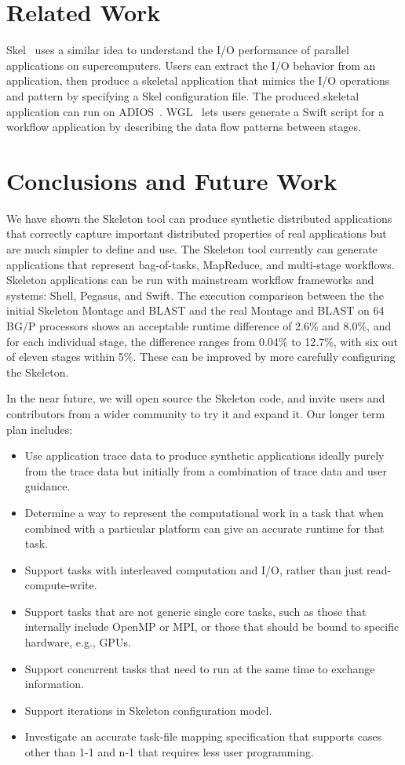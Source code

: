 \documentclass{sig-alternate}
\newenvironment{shortlist}{
        \vspace*{-0.5em}
  \begin{itemize}
  \setlength{\itemsep}{-0.1em}
}{
  \end{itemize}
        \vspace*{-0.5em}
}
\begin{document}
 
\section{Related Work}  \label{sec:related}
Skel~\cite{Skel} uses a similar idea to understand the I/O performance of parallel applications on supercomputers. Users can extract 
the I/O behavior from an application, then produce a skeletal application that mimics the I/O operations and pattern by specifying
a Skel configuration file. The produced skeletal application can run on ADIOS~\cite{ADIOS}. WGL~\cite{WGL} lets users generate a Swift script for a
workflow application by describing the data flow patterns between stages.


\section{Conclusions and Future Work} \label{sec:end}

We have shown the Skeleton tool can produce synthetic distributed applications that correctly capture important distributed properties of real applications but are much simpler to define and use.
The Skeleton tool currently can generate applications that represent bag-of-tasks, MapReduce, and multi-stage workflows.
Skeleton applications can be run with mainstream workflow frameworks and systems: Shell, Pegasus, and Swift.
The execution comparison between the the initial Skeleton Montage and BLAST and the real Montage and BLAST on 64 BG/P processors shows an acceptable runtime difference  of 2.6\% and 8.0\%, and for each individual
stage, the difference ranges from 0.04\% to 12.7\%, with six out of eleven stages within 5\%.  These can be improved by more carefully configuring the Skeleton.

In the near future, we will open source the Skeleton code, and invite users and contributors from a wider community to try it and expand it.
%
Our longer term plan includes: 
\begin{shortlist}
\item {} Use application trace data to produce synthetic applications ideally purely from the trace data but initially from a combination of trace data and user guidance.
\item {} Determine a way to represent the computational work in a task that when combined with a particular platform can give an accurate runtime for that task.
\item {} Support tasks with interleaved computation and I/O, rather than just read-compute-write.
\item {} Support tasks that are not generic single core tasks, such as those that internally include OpenMP or MPI, or those that should be bound to specific hardware, e.g., GPUs.
\item {} Support concurrent tasks that need to run at the same time to exchange information.
\item {} Support iterations in Skeleton configuration model.
\item {} Investigate an accurate task-file mapping specification that supports cases other than 1-1 and n-1 that requires less user programming. 
\end{shortlist}
\end{document}
